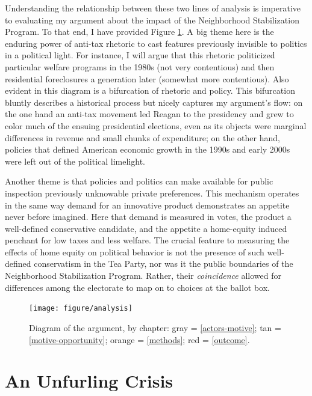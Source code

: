 \documentclass[12pt,oneside]{psthesis}
\begin{document}
Understanding the relationship between these two lines of analysis is imperative to evaluating my argument about the impact of the Neighborhood Stabilization Program.
To that end, I have provided Figure \ref{fig:analysis}.
A big theme here is the enduring power of anti-tax rhetoric to cast features previously invisible to politics in a political light.
For instance, I will argue that this rhetoric politicized particular welfare programs in the 1980s (not very contentious) and then residential foreclosures a generation later (somewhat more contentious).
Also evident in this diagram is a bifurcation of rhetoric and policy.
This bifurcation bluntly describes a historical process but nicely captures my argument's flow: on the one hand an anti-tax movement led Reagan to the presidency and grew to color much of the ensuing presidential elections, even as its objects were marginal differences in revenue and small chunks of expenditure; on the other hand, policies that defined American economic growth in the 1990s and early 2000s were left out of the political limelight.

Another theme is that policies and politics can make available for public inspection previously unknowable private preferences.
This mechanism operates in the same way demand for an innovative product demonstrates an appetite never before imagined.
Here that demand is measured in votes, the product a well-defined conservative candidate, and the appetite a home-equity induced penchant for low taxes and less welfare.
The crucial feature to measuring the effects of home equity on political behavior is not the presence of such well-defined conservatism in the Tea Party, nor was it the public boundaries of the Neighborhood Stabilization Program.
Rather, their \emph{coincidence} allowed for differences among the electorate to map on to choices at the ballot box.
\begin{figure}

{\centering \texttt{[image: figure/analysis]} 

}

\caption{Diagram of the argument, by chapter: gray = \ref{actors-motive}; tan = \ref{motive-opportunity}; orange = \ref{methods}; red = \ref{outcome}.}\label{fig:analysis}
\end{figure}
\hypertarget{crisis}{%
\section{An Unfurling Crisis}\label{crisis}}
\end{document}
